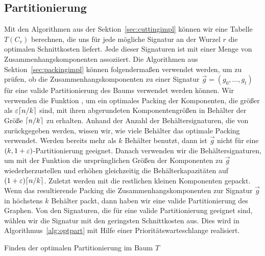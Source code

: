 \subsection{Partitionierung}
Mit den Algorithmen aus der Sektion~\ref{sec:cuttingimpl} können wir eine Tabelle $T(C_v)$ berechnen, die uns für jede mögliche Signatur an der Wurzel $r$ die optimalen Schnittkosten liefert.
Jede dieser Signaturen ist mit einer Menge von Zusammenhangskomponenten assoziiert.
Die Algorithmen aus Sektion~\ref{sec:packingimpl} können folgendermaßen verwendet werden, um zu prüfen, ob die Zusammenhangskomponenten zu einer Signatur $\vec{g} = (g_0, \ldots, g_t)$ für eine valide Partitionierung des Baums verwendet werden können.
Wir verwenden die Funktion \mbox{}, um ein optimales Packing der Komponenten, die größer als $\varepsilon \lceil n/k\rceil$ sind, mit ihren abgerundeten Komponentengrößen in Behälter der Größe $\lceil n/k\rceil$ zu erhalten.
Anhand der Anzahl der Behältersignaturen, die von  zurückgegeben werden, wissen wir, wie viele Behälter das optimale Packing verwendet.
Werden bereits mehr als $k$ Behälter benutzt, dann ist $\vec{g}$ nicht für eine $(k, 1+\varepsilon)$\hyp Partitionierung geeignet.
Danach verwenden wir die Behältersignaturen, um mit der Funktion  die ursprünglichen Größen der Komponenten zu $\vec{g}$ wiederherzustellen und erhöhen gleichzeitig die Behälterkapazitäten auf $(1+\varepsilon) \lceil n/k\rceil$.
Zuletzt werden mit  die restlichen kleinen Komponenten gepackt.
Wenn das resultierende Packing die Zusammenhangskomponenten zur Signatur $\vec{g}$ in höchstens $k$ Behälter packt, dann haben wir eine valide Partitionierung des Graphen.
Von den Signaturen, die für eine valide Partitionierung geeignet sind, wählen wir die Signatur mit den geringsten Schnittkosten aus.
Dies wird in Algorithmus~\ref{alg:optpart} mit Hilfe einer Prioritätswarteschlange realisiert.

\begin{algorithm}
    \caption{Finden der optimalen Partitionierung im Baum $T$}
    \label{alg:optpart}
    \begin{algorithmic}[1]
         
             
        \EndFor
                    \State{\Break} 
                \EndIf
            \EndIf
        \EndWhile
    \end{algorithmic}
\end{algorithm}

